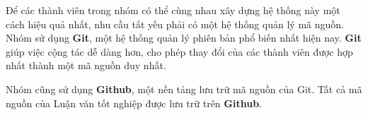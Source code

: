 Để các thành viên trong nhóm có thể cùng nhau xây dựng hệ thống này một cách hiệu quả nhất, nhu cầu tất yếu phải có một hệ thống quản lý mã nguồn. Nhóm sử dụng \textbf{Git}, một hệ thống quản lý phiên bản phổ biến nhất hiện nay. \textbf{Git} giúp việc cộng tác dễ dàng hơn, cho phép thay đổi của các thành viên được hợp nhất thành một mã nguồn duy nhất.\par

Nhóm cũng sử dụng \textbf{Github}, một nền tảng lưu trữ mã nguồn của Git. Tất cả mã nguồn của Luận văn tốt nghiệp được lưu trữ trên \textbf{Github}.